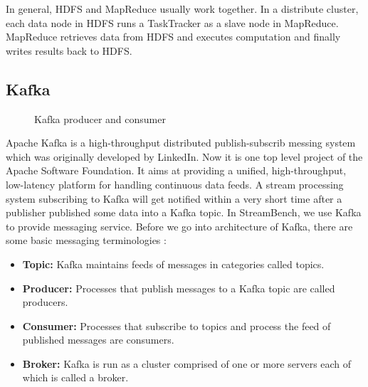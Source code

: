 In general, HDFS and MapReduce usually work together. In a distribute cluster, each data node in HDFS runs a TaskTracker as a slave node in MapReduce. MapReduce retrieves data from HDFS and executes computation and finally writes results back to HDFS.

\subsection{Kafka}
\label{subsection:kafka}

\begin{figure}
  \begin{center}
   \caption{Kafka producer and consumer \cite{Kafka}}
   \label{fig:kafka_producer_consumer}
  \end{center}
\end{figure}

Apache Kafka is a high-throughput distributed publish-subscrib messing system which was originally developed by LinkedIn. Now it is one top level project of the Apache Software Foundation. It aims at providing a unified, high-throughput, low-latency platform for handling continuous data feeds. A stream processing system subscribing to Kafka will get notified within a very short time after a publisher published some data into a Kafka topic. In StreamBench, we use Kafka to provide messaging service. Before we go into architecture of Kafka, there are some basic messaging terminologies \cite{Kafka}:

\begin{itemize}
  \item \textbf{Topic:} Kafka maintains feeds of messages in categories called topics. 
  \item \textbf{Producer:} Processes that publish messages to a Kafka topic are called producers.
  \item \textbf{Consumer:} Processes that subscribe to topics and process the feed of published messages are consumers.
   \item \textbf{Broker:} Kafka is run as a cluster comprised of one or more servers each of which is called a broker.
\end{itemize}

